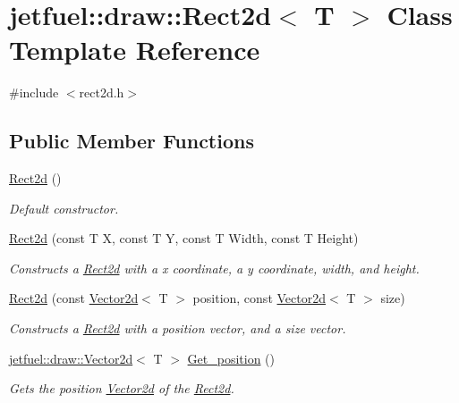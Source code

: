 \hypertarget{classjetfuel_1_1draw_1_1Rect2d}{}\section{jetfuel\+:\+:draw\+:\+:Rect2d$<$ T $>$ Class Template Reference}
\label{classjetfuel_1_1draw_1_1Rect2d}


{\ttfamily \#include $<$rect2d.\+h$>$}

\subsection*{Public Member Functions}
\begin{DoxyCompactItemize}
\item 
\hyperlink{classjetfuel_1_1draw_1_1Rect2d_af5a9c18dea4e196ec326f31ab63ad644}{Rect2d} ()
\begin{DoxyCompactList}\small\item\em Default constructor. \end{DoxyCompactList}\item 
\hyperlink{classjetfuel_1_1draw_1_1Rect2d_aeab9db448df3318ab83fe19f3844f498}{Rect2d} (const T X, const T Y, const T Width, const T Height)
\begin{DoxyCompactList}\small\item\em Constructs a \hyperlink{classjetfuel_1_1draw_1_1Rect2d}{Rect2d} with a x coordinate, a y coordinate, width, and height. \end{DoxyCompactList}\item 
\hyperlink{classjetfuel_1_1draw_1_1Rect2d_ad2cf8c7744252e2202284a230c6d7652}{Rect2d} (const \hyperlink{classjetfuel_1_1draw_1_1Vector2d}{Vector2d}$<$ T $>$ position, const \hyperlink{classjetfuel_1_1draw_1_1Vector2d}{Vector2d}$<$ T $>$ size)
\begin{DoxyCompactList}\small\item\em Constructs a \hyperlink{classjetfuel_1_1draw_1_1Rect2d}{Rect2d} with a position vector, and a size vector. \end{DoxyCompactList}\item 
\hyperlink{classjetfuel_1_1draw_1_1Vector2d}{jetfuel\+::draw\+::\+Vector2d}$<$ T $>$ \hyperlink{classjetfuel_1_1draw_1_1Rect2d_abcc7abd189cc592850484d1314f6220b}{Get\+\_\+position} ()
\begin{DoxyCompactList}\small\item\em Gets the position \hyperlink{classjetfuel_1_1draw_1_1Vector2d}{Vector2d} of the \hyperlink{classjetfuel_1_1draw_1_1Rect2d}{Rect2d}. \end{DoxyCompactList}\item 

\end{DoxyCompactItemize}
